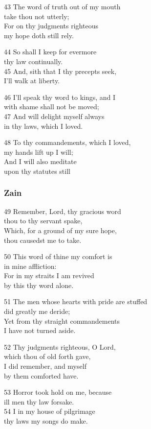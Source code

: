 \begin{multicols}{3}
43 The word of truth out of my mouth\\
take thou not utterly;\\
For on thy judgments righteous\\
my hope doth still rely.

44 So shall I keep for evermore\\
thy law continually.\\
45 And, sith that I thy precepts seek,\\
I’ll walk at liberty.

46 I’ll speak thy word to kings, and I\\
with shame shall not be moved;\\
47 And will delight myself always\\
in thy laws, which I loved.

48 To thy commandements, which I loved,\\
my hands lift up I will;\\
And I will also meditate\\
upon thy statutes still

\subsubsection*{Zain}

49 Remember, Lord, thy gracious word\\
thou to thy servant spake,\\
Which, for a ground of my sure hope,\\
thou causedst me to take.

50 This word of thine my comfort is\\
in mine affliction:\\
For in my straits I am revived\\
by this thy word alone.

51 The men whose hearts with pride are stuffed\\
did greatly me deride;\\
Yet from thy straight commandements\\
I have not turned aside.

52 Thy judgments righteous, O Lord,\\
which thou of old forth gave,\\
I did remember, and myself\\
by them comforted have.

53 Horror took hold on me, because\\
ill men thy law forsake.\\
54 I in my house of pilgrimage\\
thy laws my songs do make.


\end{multicols}
